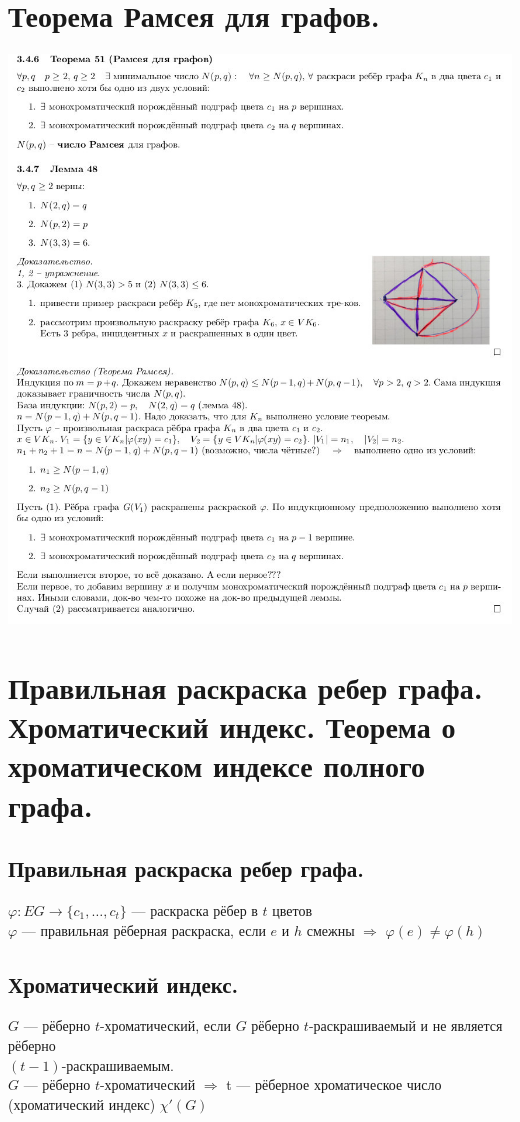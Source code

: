 \documentclass[12pt]{article}
\begin{document}
\section{Теорема Рамсея для графов.}
	\includegraphics[width=500pt]{14}

\section{Правильная раскраска ребер графа. Хроматический индекс. Теорема о хроматическом индексе полного графа.}
	\subsection{Правильная раскраска ребер графа.}
	$\varphi: EG \to \{c_1,\dotsc,c_t\}$ — раскраска рёбер в $t$ цветов\\
	$\varphi$ 	— правильная рёберная раскраска, если $e$ и $h$ смежны $\Rightarrow$ $\varphi(e) \neq \varphi(h)$\\
\subsection{Хроматический индекс.}
	$G$ — рёберно $t$-хроматический, если $G$ рёберно $t$-раскрашиваемый и не является рёберно\\$(t-1)$-раскрашиваемым.\\
	$G$ — рёберно $t$-хроматический $\Rightarrow$ t — рёберное хроматическое число (хроматический индекс) $\chi'(G)$
\end{document}
